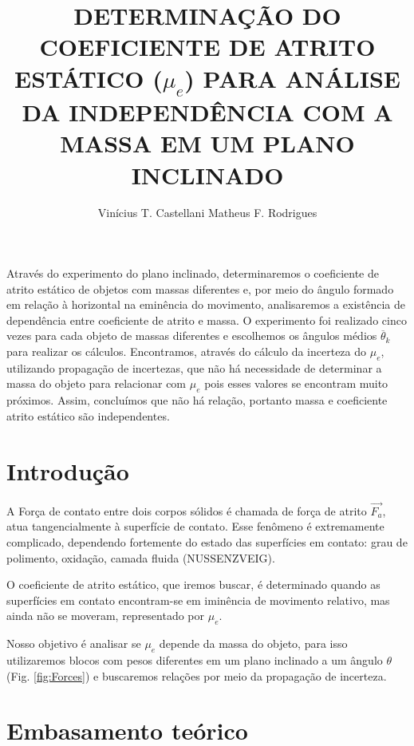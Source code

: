 \documentclass[12pt]{article}
\numberwithin{equation}{section} %
\begin{document}
\title{DETERMINAÇÃO DO COEFICIENTE DE ATRITO ESTÁTICO ($ \mu_{e} $) PARA ANÁLISE DA INDEPENDÊNCIA COM A MASSA EM UM PLANO INCLINADO}
\author{Vinícius T. Castellani Matheus F. Rodrigues } 
\maketitle 

\begin{resumo} 

Através do experimento do plano inclinado, determinaremos o coeficiente de atrito estático de objetos com massas diferentes e, por meio do ângulo formado em relação à horizontal na eminência do movimento, analisaremos a existência de dependência entre coeficiente de atrito e massa. O experimento foi realizado cinco vezes para cada objeto de massas diferentes e escolhemos os ângulos médios $\overline{\theta}_{k}$ para realizar os cálculos. Encontramos, através do cálculo da incerteza do $\mu_{e}$, utilizando propagação de incertezas, que não há necessidade de determinar a massa do objeto para relacionar com $\mu_{e}$ pois esses valores se encontram muito próximos. Assim, concluímos que não há relação, portanto massa e coeficiente atrito estático são independentes.

\end{resumo}

\section{Introdução}

A Força de contato entre dois corpos sólidos é chamada de força de atrito $\vec{F_{a}}$, atua tangencialmente à superfície de contato. Esse fenômeno é extremamente complicado,  dependendo fortemente do estado das superfícies em contato: grau de polimento, oxidação, camada fluida (NUSSENZVEIG).

O coeficiente de atrito estático, que iremos buscar, é determinado quando as superfícies em contato encontram-se em iminência de movimento relativo, mas ainda não se moveram, representado por  $\mu_{e}$.

Nosso objetivo é analisar se $\mu_{e}$ depende da massa do objeto, para isso utilizaremos blocos com pesos diferentes em um plano inclinado a um ângulo $\theta$ (Fig. 
 \ref{fig:Forces}) e buscaremos relações por meio da propagação de incerteza. 

\section{Embasamento teórico }
\end{document}

